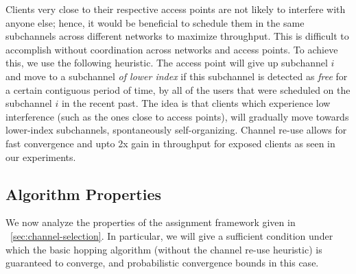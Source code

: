  Clients very close to their respective access points are not likely to interfere with anyone else;  
hence, it would be beneficial to schedule them in the same subchannels across different networks to maximize throughput. 
This is difficult to accomplish without coordination across networks and access points.
To achieve this, we use the following heuristic.
The access point will give up subchannel $i$ and move to a subchannel \emph{of lower index} if this subchannel is detected as \emph{free} for a certain contiguous period of time, by all of the users that were scheduled on the subchannel $i$ in the recent past. 
The idea is that clients which experience low interference (such as the ones close to access points), 
will gradually move towards lower-index subchannels, spontaneously self-organizing. 
Channel re-use allows for fast convergence and upto 2x gain in throughput for exposed clients as seen in our experiments. 



\subsection{Algorithm Properties}
\label{sec:proof}


We now analyze the properties of the assignment framework given in ~\ref{sec:channel-selection}. 
In particular, we will give a sufficient condition under which the basic hopping algorithm 
(without the channel re-use heuristic) is guaranteed to converge, 
and probabilistic convergence bounds in this case. 

